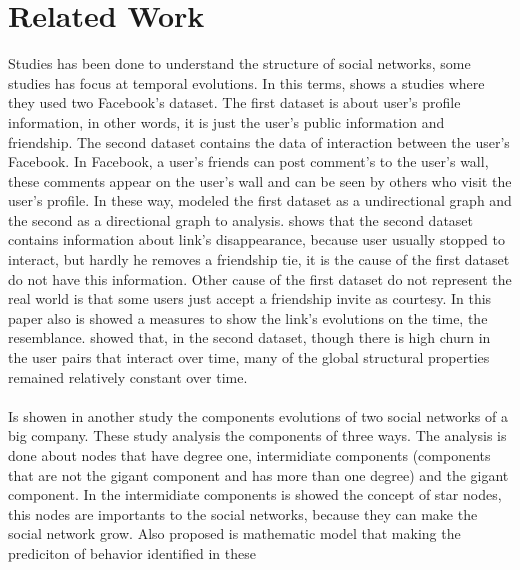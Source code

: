 \section{Related Work}









Studies has been done to understand the structure of social networks, some studies has focus at temporal evolutions. 
In this terms, \cite{Viswanath:2009} shows a studies where they used two Facebook's dataset. 
The first dataset is about user's profile information, in other words, it is just the user's public information 
and friendship. 
The second dataset contains the data of interaction between the user's Facebook. In Facebook, a user's friends 
can post comment's to the user's wall, these comments appear on the user's wall and can be seen  by others who 
visit the user's profile. 
In these way, \cite{Viswanath:2009} modeled the first dataset as a undirectional graph and the second as a directional 
graph to analysis.
\cite{Viswanath:2009} shows that the second dataset contains information about link's disappearance, because user 
usually stopped to interact, but hardly he removes a friendship tie, it is the cause of the first dataset do not have 
this information. Other cause of the first dataset do not represent the real world is that some users just accept a 
friendship invite as courtesy. In this paper also is showed a measures to show the link's evolutions on the time, 
the resemblance.
\cite{Viswanath:2009} showed that, in the second dataset, though there is high churn in the user pairs that interact 
over time, many of the global structural properties remained relatively constant over time.\\
\\
Is showen in another study \cite{Kumar:2006} the components evolutions of two social networks of a big company. These 
study analysis the components of three ways. The analysis is done about nodes that have degree one, intermidiate components 
(components that are not the gigant component and has more than one degree) and the gigant component. In the intermidiate 
components is showed the concept of star nodes, this nodes are importants to the social networks, because they can make 
the social network grow. Also proposed is mathematic model that making the prediciton of behavior identified in these 
